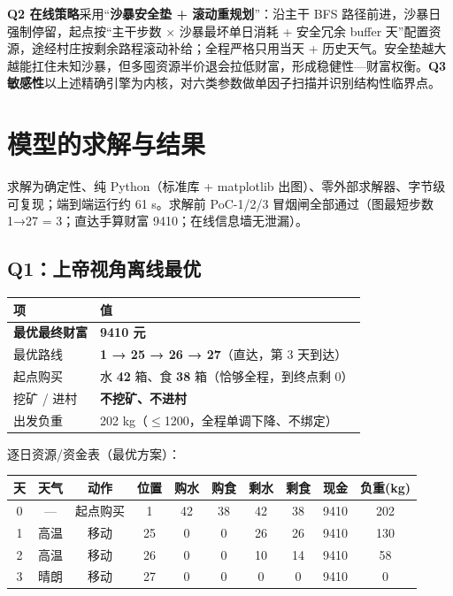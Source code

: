 \documentclass[12pt,a4paper]{ctexart}
\begin{document}
\textbf{Q2 在线策略}采用“\textbf{沙暴安全垫 + 滚动重规划}”：沿主干 BFS 路径前进，沙暴日强制停留，起点按“主干步数 $\times$ 沙暴最坏单日消耗 + 安全冗余 buffer 天”配置资源，途经村庄按剩余路程滚动补给；全程严格只用当天 + 历史天气。安全垫越大越能扛住未知沙暴，但多囤资源半价退会拉低财富，形成稳健性—财富权衡。\textbf{Q3 敏感性}以上述精确引擎为内核，对六类参数做单因子扫描并识别结构性临界点。

\section{模型的求解与结果}

求解为确定性、纯 Python（标准库 + matplotlib 出图）、零外部求解器、字节级可复现；端到端运行约 61 s。求解前 PoC-1/2/3 冒烟闸全部通过（图最短步数 1→27 = 3；直达手算财富 9410；在线信息墙无泄漏）。

\subsection{Q1：上帝视角离线最优}

\begin{center}
\begin{tabular}{ll}
\toprule
项 & 值 \\
\midrule
\textbf{最优最终财富} & \textbf{9410 元} \\
最优路线 & \textbf{1 → 25 → 26 → 27}（直达，第 3 天到达） \\
起点购买 & 水 \textbf{42} 箱、食 \textbf{38} 箱（恰够全程，到终点剩 0） \\
挖矿 / 进村 & \textbf{不挖矿、不进村} \\
出发负重 & 202 kg（$\le$1200，全程单调下降、不绑定） \\
\bottomrule
\end{tabular}
\end{center}

逐日资源/资金表（最优方案）：

\begin{center}
\begin{tabular}{cccccccccc}
\toprule
天 & 天气 & 动作 & 位置 & 购水 & 购食 & 剩水 & 剩食 & 现金 & 负重(kg) \\
\midrule
0 & --- & 起点购买 & 1 & 42 & 38 & 42 & 38 & 9410 & 202 \\
1 & 高温 & 移动 & 25 & 0 & 0 & 26 & 26 & 9410 & 130 \\
2 & 高温 & 移动 & 26 & 0 & 0 & 10 & 14 & 9410 & 58 \\
3 & 晴朗 & 移动 & 27 & 0 & 0 & 0 & 0 & 9410 & 0 \\
\bottomrule
\end{tabular}
\end{center}
\end{document}
